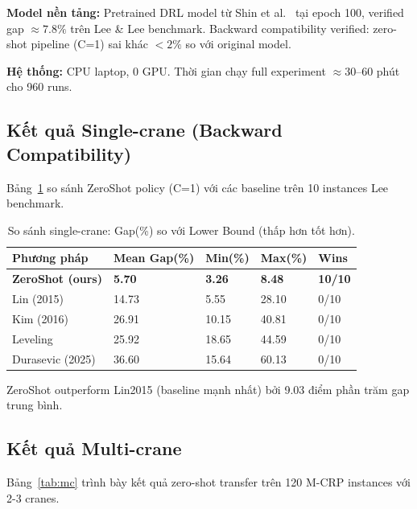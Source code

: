 \documentclass[11pt,a4paper]{article}
\theoremstyle{definition}
\newcommand{\1}{\mathbbm{1}}
\begin{document}
\textbf{Model nền tảng:} Pretrained DRL model từ Shin et al.~\cite{shin2026} tại epoch 100, verified gap $\approx 7.8\%$ trên Lee \& Lee benchmark. Backward compatibility verified: zero-shot pipeline (C=1) sai khác $< 2\%$ so với original model.

\textbf{Hệ thống:} CPU laptop, 0 GPU. Thời gian chạy full experiment $\approx 30$--$60$ phút cho 960 runs.

\subsection{Kết quả Single-crane (Backward Compatibility)}

Bảng~\ref{tab:single} so sánh ZeroShot policy (C=1) với các baseline trên 10 instances Lee benchmark.

\begin{table}[h!]
    \centering
    \caption{So sánh single-crane: Gap(\%) so với Lower Bound (thấp hơn tốt hơn).}
    \label{tab:single}
    \begin{tabularx}{\textwidth}{lXXXX}
        \toprule
        Phương pháp & Mean Gap(\%) & Min(\%) & Max(\%) & Wins \\
        \midrule
        \textbf{ZeroShot (ours)} & \textbf{5.70} & \textbf{3.26} & \textbf{8.48} & \textbf{10/10} \\
        Lin (2015)~\cite{lin2015} & 14.73 & 5.55 & 28.10 & 0/10 \\
        Kim (2016)~\cite{kim2016} & 26.91 & 10.15 & 40.81 & 0/10 \\
        Leveling & 25.92 & 18.65 & 44.59 & 0/10 \\
        Durasevic (2025)~\cite{durasevic2025} & 36.60 & 15.64 & 60.13 & 0/10 \\
        \bottomrule
    \end{tabularx}
\end{table}

ZeroShot outperform Lin2015 (baseline mạnh nhất) bởi 9.03 điểm phần trăm gap trung bình.

\subsection{Kết quả Multi-crane}

Bảng~\ref{tab:mc} trình bày kết quả zero-shot transfer trên 120 M-CRP instances với 2-3 cranes.
\end{document}
